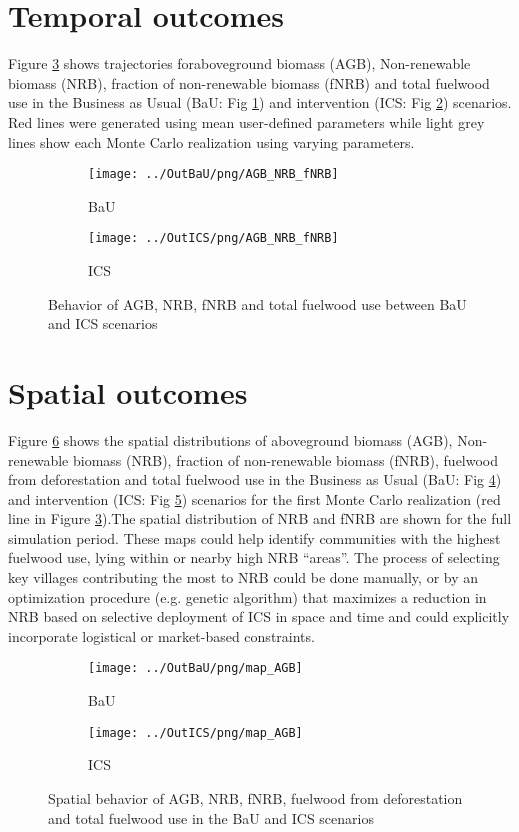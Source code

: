\documentclass[english,a4paper,11pt,twoside]{report}
\begin{document}
\pagebreak
\section{Temporal outcomes} \label{sec:tempout}
Figure \ref{fig:fig} shows trajectories foraboveground biomass (AGB), Non-renewable biomass (NRB), fraction of non-renewable biomass (fNRB) and total fuelwood use in the Business as Usual (BaU: Fig \ref{fig:sfig1}) and intervention (ICS: Fig \ref{fig:sfig2}) scenarios. Red lines were generated using mean user-defined parameters while light grey lines show each Monte Carlo realization using varying parameters.
\begin{figure}[H]
	\begin{subfigure}{.5\textwidth}
		\centering
		\texttt{[image: ../OutBaU/png/AGB\_NRB\_fNRB]}
		\caption{BaU}
		\label{fig:sfig1}
	\end{subfigure}%
	\begin{subfigure}{.5\textwidth}
		\centering
		\texttt{[image: ../OutICS/png/AGB\_NRB\_fNRB]}
		\caption{ICS}
		\label{fig:sfig2}
	\end{subfigure}
	\caption{Behavior of AGB, NRB, fNRB and total fuelwood use between BaU and ICS scenarios}
	\label{fig:fig}
\end{figure}

\pagebreak
\section{Spatial outcomes} \label{sec:spaout}
Figure \ref{fig:1fig} shows the spatial distributions of aboveground biomass (AGB), Non-renewable biomass (NRB), fraction of non-renewable biomass (fNRB), fuelwood from deforestation and total fuelwood use in the Business as Usual (BaU: Fig \ref{fig:1sfig1}) and intervention (ICS: Fig \ref{fig:1sfig2}) scenarios for the first Monte Carlo realization (red line in Figure \ref{fig:fig}).The spatial distribution of NRB and fNRB are shown for the full simulation period. These maps could help identify communities with the highest fuelwood use, lying within or nearby high NRB “areas”. The process of selecting key villages contributing the most to NRB could be done manually, or by an optimization procedure (e.g. genetic algorithm) that maximizes a reduction in NRB based on selective deployment of ICS in space and time and could explicitly incorporate logistical or market-based constraints.

\begin{figure}[H]
	\begin{subfigure}{.5\textwidth}
		\centering
		\texttt{[image: ../OutBaU/png/map\_AGB]}
		\caption{BaU}
		\label{fig:1sfig1}
	\end{subfigure}%
	\begin{subfigure}{.5\textwidth}
		\centering
		\texttt{[image: ../OutICS/png/map\_AGB]}
		\caption{ICS}
		\label{fig:1sfig2}
	\end{subfigure}
	\caption{Spatial behavior of AGB, NRB, fNRB, fuelwood from deforestation and total fuelwood use in the BaU and ICS scenarios}
	\label{fig:1fig}
\end{figure}
\end{document}
